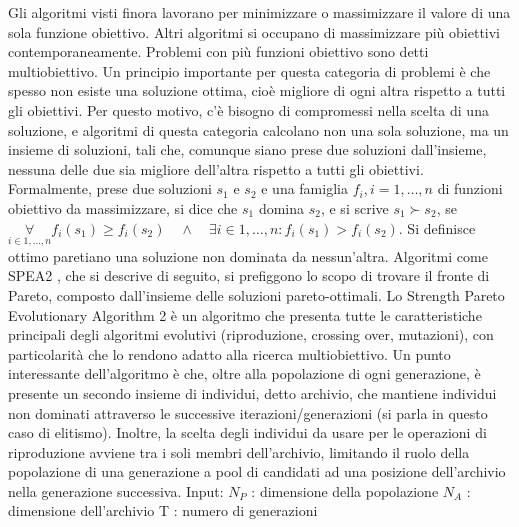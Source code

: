 \documentclass[12pt]{article}
\begin{document}
Gli algoritmi visti finora lavorano per minimizzare o massimizzare il valore di una sola funzione obiettivo. Altri algoritmi si occupano di massimizzare più obiettivi contemporaneamente. Problemi con più funzioni obiettivo sono detti multiobiettivo. Un principio importante per questa categoria di problemi è che spesso non esiste una soluzione ottima, cioè migliore di ogni altra rispetto a tutti gli obiettivi. Per questo motivo, c'è bisogno di compromessi nella scelta di una soluzione, e algoritmi di questa categoria calcolano non una sola soluzione, ma un insieme di soluzioni, tali che, comunque siano prese due soluzioni dall'insieme, nessuna delle due sia migliore dell'altra rispetto a tutti gli obiettivi. Formalmente, prese due soluzioni $s_1$ e $s_2$ e una famiglia $f_i, i = 1,\dots,n$ di funzioni obiettivo da massimizzare, si dice che $s_1$ domina $s_2$, e si scrive $s_1 \succ s_2$, se\newline
 $\underset{i \in 1,\dots,n}{\forall} f_i(s_1) \geq f_i(s_2) \quad \land \quad \exists i \in 1,\dots,n : f_i(s_1) > f_i(s_2)$.\newline
Si definisce ottimo paretiano una soluzione non dominata da nessun'altra. Algoritmi come SPEA2 \cite{ZitzlerAl2001}, che si descrive di seguito, si prefiggono lo scopo di trovare il fronte di Pareto, composto dall'insieme delle soluzioni pareto-ottimali.\newline
\newline
Lo Strength Pareto Evolutionary Algorithm 2 è un algoritmo che presenta tutte le caratteristiche principali degli algoritmi evolutivi (riproduzione, crossing over, mutazioni), con particolarità che lo rendono adatto alla ricerca multiobiettivo. Un punto interessante dell'algoritmo è che, oltre alla popolazione di ogni generazione, è presente un secondo insieme di individui, detto archivio, che mantiene individui non dominati attraverso le successive iterazioni/generazioni (si parla in questo caso di elitismo). Inoltre, la scelta degli individui da usare per le operazioni di riproduzione avviene tra i soli membri dell'archivio, limitando il ruolo della popolazione di una generazione a pool di candidati ad una posizione dell'archivio nella generazione successiva. \newline
\newline
Input: \newline
\tab \tab$ N_P$ : dimensione della popolazione \newline
\tab \tab $N_A$ : dimensione dell'archivio \newline
\tab \tab T : numero di generazioni \newline
\end{document}
